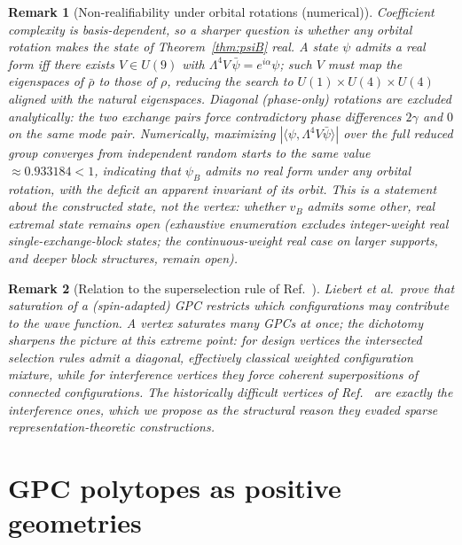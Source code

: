 \documentclass[11pt]{article}
\newtheorem{remark}{Remark}
\begin{document}
\begin{remark}[Non-realifiability under orbital rotations (numerical)]
\label{rem:orbit}
Coefficient complexity is basis-dependent, so a sharper question is whether
any orbital rotation makes the state of Theorem~\ref{thm:psiB} real. A state
$\psi$ admits a real form iff there exists $V \in U(9)$ with
$\Lambda^4 V\,\bar\psi = e^{i\alpha}\psi$; such $V$ must map the
eigenspaces of $\bar\rho$ to those of $\rho$, reducing the search to
$U(1)\times U(4)\times U(4)$ aligned with the natural eigenspaces. Diagonal
(phase-only) rotations are excluded analytically: the two exchange pairs force
contradictory phase differences $2\gamma$ and $0$ on the same mode pair.
Numerically, maximizing $|\langle\psi,\Lambda^4 V\bar\psi\rangle|$ over
the full reduced group converges from independent random starts to the same
value $\approx 0.933184 < 1$, indicating that $\psi_B$ admits no real form
under any orbital rotation, with the deficit an apparent invariant of its
orbit. This is a statement about the constructed state, not the vertex:
whether $v_B$ admits some other, real extremal state remains open (exhaustive
enumeration excludes integer-weight real single-exchange-block states; the
continuous-weight real case on larger supports, and deeper block structures,
remain open).
\end{remark}

\begin{remark}[Relation to the superselection rule of Ref.~\cite{Liebert2025}]
Liebert \emph{et al.}\ prove that saturation of a (spin-adapted) GPC
restricts which configurations may contribute to the wave function.
A vertex saturates many GPCs at once; the dichotomy sharpens the picture at
this extreme point: for design vertices the intersected selection rules
admit a diagonal, effectively classical weighted configuration mixture,
while for interference vertices they force coherent superpositions of
connected configurations. The historically difficult vertices of
Ref.~\cite{AK2008} are exactly the interference ones, which we propose as
the structural reason they evaded sparse representation-theoretic
constructions.
\end{remark}

\section{GPC polytopes as positive geometries}
\label{sec:posgeo}
\end{document}
